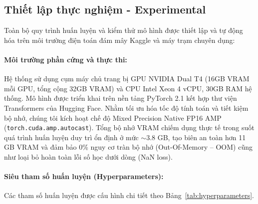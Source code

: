\documentclass[pdflatex,sn-mathphys-num]{sn-jnl}
\theoremstyle{thmstyleone}
\theoremstyle{thmstyletwo}
\theoremstyle{thmstylethree}
\begin{document}
\subsection{Thiết lập thực nghiệm - Experimental}
\label{subsec:experimental}

Toàn bộ quy trình huấn luyện và kiểm thử mô hình được thiết lập và tự động hóa trên môi trường điện toán đám mây Kaggle và máy trạm chuyên dụng:

\paragraph{Môi trường phần cứng và thực thi:}
Hệ thống sử dụng cụm máy chủ trang bị GPU NVIDIA Dual T4 (16GB VRAM mỗi GPU, tổng cộng 32GB VRAM) và CPU Intel Xeon 4 vCPU, 30GB RAM hệ thống. Mô hình được triển khai trên nền tảng PyTorch 2.1 kết hợp thư viện Transformers của Hugging Face. Nhằm tối ưu hóa tốc độ tính toán và tiết kiệm bộ nhớ, chúng tôi kích hoạt chế độ Mixed Precision Native FP16 AMP (\texttt{torch.cuda.amp.autocast}). Tổng bộ nhớ VRAM chiếm dụng thực tế trong suốt quá trình huấn luyện duy trì ổn định ở mức $\sim 3.8$ GB, tạo biên an toàn hơn 11 GB VRAM và đảm bảo 0\% nguy cơ tràn bộ nhớ (Out-Of-Memory -- OOM) cũng như loại bỏ hoàn toàn lỗi số học dưới dòng (NaN loss).

\paragraph{Siêu tham số huấn luyện (Hyperparameters):}
Các tham số huấn luyện được cấu hình chi tiết theo Bảng~\ref{tab:hyperparameters}.
\end{document}
